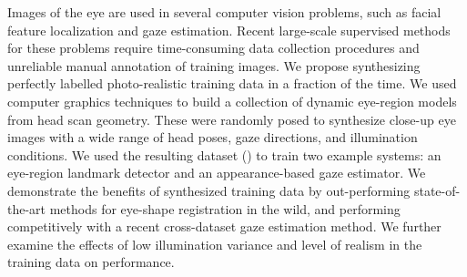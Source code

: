 Images of the eye are used in several computer vision problems, such as facial feature localization and gaze estimation.
Recent large-scale supervised methods for these problems require time-consuming data collection procedures and unreliable manual annotation of training images.
We propose synthesizing perfectly labelled photo-realistic training data in a fraction of the time.
We used computer graphics techniques to build a collection of dynamic eye-region models from head scan geometry.
%
These were randomly posed to synthesize close-up eye images with a wide range of head poses, gaze directions, and illumination conditions.
%
We used the resulting dataset (\dataset) to train two example systems: an eye-region landmark detector and an appearance-based gaze estimator.
We demonstrate the benefits of synthesized training data by out-performing state-of-the-art methods for eye-shape registration in the wild, and performing competitively with a recent cross-dataset gaze estimation method.
We further examine the effects of low illumination variance and level of realism in the training data on performance.
%